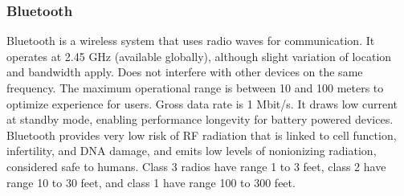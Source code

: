 \documentclass[12pt]{article}
\begin{document}
\subsubsection{Bluetooth}
Bluetooth is a wireless system that uses radio waves for communication. It operates at 2.45 GHz (available globally), although slight variation of  location and bandwidth apply. Does not interfere with other devices on the same frequency. The maximum operational range is between 10 and 100 meters to optimize experience for users. Gross data rate is 1 Mbit/s. It draws low current at standby mode, enabling performance longevity for battery powered devices. Bluetooth provides very low risk of RF radiation that is linked to cell function, infertility, and DNA damage, and emits low levels of nonionizing radiation, considered safe to humans. Class 3 radios have range 1 to 3 feet, class 2 have range 10 to 30 feet, and class 1 have range 100 to 300 feet.\\
\hfill \\
\pagebreak
\hfill \\
\hfill 
\end{document}
